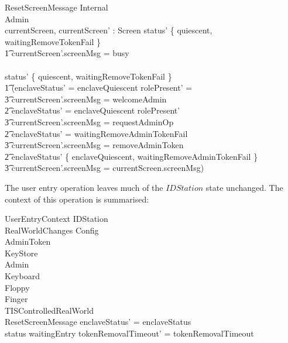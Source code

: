 \begin{schema}{ResetScreenMessage}
        \Delta Internal
\\      \Delta Admin
\\      currentScreen, currentScreen' : Screen
\where
        status' \notin \{ quiescent, waitingRemoveTokenFail \} 
\\ \t1 \land currentScreen'.screenMsg = busy
\\      \lor
\\      status' \in \{ quiescent, waitingRemoveTokenFail \}
\\ \t1 \land (enclaveStatus' = enclaveQuiescent \land rolePresent' = \Nil 
\\ \t3          \land currentScreen'.screenMsg = welcomeAdmin
\\ \t2 \lor enclaveStatus' = enclaveQuiescent \land rolePresent' \neq \Nil 
\\ \t3          \land currentScreen'.screenMsg = requestAdminOp
\\ \t2 \lor enclaveStatus' = waitingRemoveAdminTokenFail 
\\ \t3          \land currentScreen'.screenMsg = removeAdminToken
\\ \t2 \lor enclaveStatus' \notin 
        \{ enclaveQuiescent, waitingRemoveAdminTokenFail \} 
\\ \t3          \land currentScreen'.screenMsg = currentScreen.screenMsg)
\end{schema}

The user entry operation leaves much of the $IDStation$ state
unchanged. The context of this operation is summarised:

\begin{schema}{UserEntryContext}
        \Delta IDStation
\\      RealWorldChanges
\also
        \Xi Config
\\      \Xi AdminToken
\\      \Xi KeyStore
\\      \Xi Admin
\\      \Xi Keyboard
\\      \Xi Floppy
\\      \Xi Finger
\also
\\      \Xi TISControlledRealWorld
\also
\\      ResetScreenMessage
\where
        enclaveStatus' = enclaveStatus
\\      status \neq waitingEntry \implies tokenRemovalTimeout' = tokenRemovalTimeout
\end{schema} 

